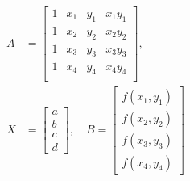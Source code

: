 \documentclass[12pt,aspectratio=169]{beamer}
\begin{document}
\begin{frame}
\begin{columns}
\begin{column}{0.5\textwidth}
               \begin{align*}
               A
               &=\begin{bmatrix}
               1 & x_1 & y_1 & x_1y_1\\
               1 & x_2 & y_2 & x_2y_2\\
               1 & x_3 & y_3 & x_3y_3\\
               1 & x_4 & y_4 & x_4y_4\\
               \end{bmatrix}
               ,
               \\
               X
               &=\begin{bmatrix}
                  a\\
                  b\\
                  c\\	
                  d
               \end{bmatrix}
               ,
               \quad
               B
               =\begin{bmatrix}
                  f(x_1,y_1)\\
                  f(x_2,y_2)\\
                  f(x_3,y_3)\\
                  f(x_4,y_4)
               \end{bmatrix}
        \end{align*}
            \end{column}
            \end{columns}
\end{frame}
    
\end{document}
